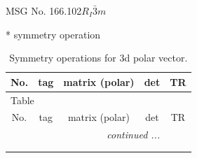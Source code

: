 \documentclass[fleqn,8pt]{jsarticle}
\begin{document}
\setcounter{MaxMatrixCols}{32}

\renewcommand{\tablename}{Table~}
\renewcommand{\figurename}{Figure~}
\begin{center}
\LARGE
MSG No. 166.102\quad$R_{I}\bar{3}m$
\end{center}
* symmetry operation
\renewcommand{\arraystretch}{1.3}
\begin{longtable}{ccccc}
\caption{Symmetry operations for 3d polar vector.}
 \\
 \hline \hline
No. & tag & matrix (polar) & det & TR \\ \hline \endfirsthead

\multicolumn{4}{l}{\tablename\ \thetable{}} \\
 \hline \hline
No. & tag & matrix (polar) & det & TR \\ \hline \endhead

 \hline \hline
\multicolumn{4}{r}{\footnotesize\it continued ...} \\ \endfoot

 \hline \hline
\multicolumn{4}{r}{} \\ \endlastfoot


\end{longtable}
\end{document}
